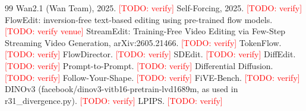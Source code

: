 \documentclass[10pt,twocolumn]{article}
\newcommand{\todo}[1]{\textcolor{red}{[TODO: #1]}}
\begin{document}
\begin{thebibliography}{99}\small
 Wan2.1 (Wan Team), 2025. \todo{verify}
 Self-Forcing, 2025. \todo{verify}
 FlowEdit: inversion-free text-based editing using pre-trained flow models. \todo{verify venue}
 StreamEdit: Training-Free Video Editing via Few-Step Streaming Video Generation, arXiv:2605.21466. \todo{verify}
 TokenFlow. \todo{verify}
 FlowDirector. \todo{verify}
 SDEdit. \todo{verify}
 DiffEdit. \todo{verify}
 Prompt-to-Prompt. \todo{verify}
 Differential Diffusion. \todo{verify}
 Follow-Your-Shape. \todo{verify}
 FiVE-Bench. \todo{verify}
 DINOv3 (facebook/dinov3-vitb16-pretrain-lvd1689m, as used in r31\_divergence.py). \todo{verify}
 LPIPS. \todo{verify}
\end{thebibliography}
\end{document}
